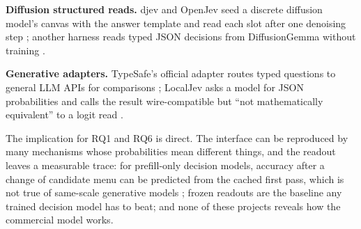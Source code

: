 \textbf{Diffusion structured reads.} djev and OpenJev seed a discrete diffusion model's canvas with the answer template and read each slot after one denoising step \citep{gh_mmastrac_djev,gh_razorback16_openjev}; another harness reads typed JSON decisions from DiffusionGemma without training \citep{gh_joshuasp_open_jev}.

\textbf{Generative adapters.} TypeSafe's official adapter routes typed questions to general LLM APIs for comparisons \citep{gh_typesafe_ai_system_one_adapter_python}; LocalJev asks a model for JSON probabilities and calls the result wire-compatible but “not mathematically equivalent” to a logit read \citep{gh_githubnext_localjev}.

The implication for RQ1 and RQ6 is direct. The interface can be reproduced by many mechanisms whose probabilities mean different things, and the readout leaves a measurable trace: for prefill-only decision models, accuracy after a change of candidate menu can be predicted from the cached first pass, which is not true of same-scale generative models \citep{arxiv2610_07716}; frozen readouts are the baseline any trained decision model has to beat; and none of these projects reveals how the commercial model works.
